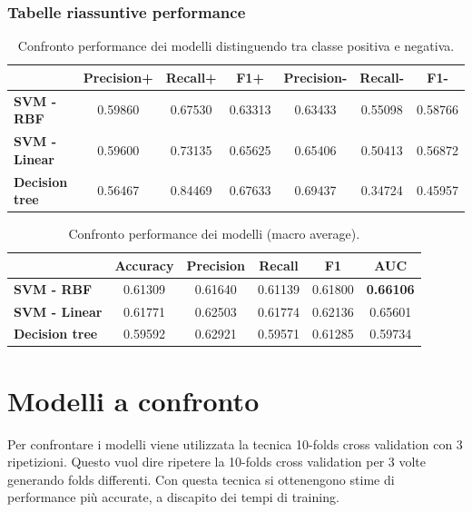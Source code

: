 \subsubsection{Tabelle riassuntive performance}
\begin{table}[H]
	\begin{center}
		\begin{tabular}{ | l | c | c | c | c |  c | c |}
			\hline
			& \textbf{Precision+} & \textbf{Recall+} &\textbf{ F1+ }	& \textbf{Precision-} &\textbf{ Recall-} & \textbf{F1-} \\
			\hline
			\textbf{SVM - RBF} & 0.59860 & 0.67530  & 0.63313 &
												    0.63433 & 0.55098 & 0.58766\\
			\textbf{SVM - Linear} & 0.59600 & 0.73135 & 0.65625&
													0.65406 & 0.50413 & 0.56872\\
			\textbf{Decision tree} & 0.56467&  0.84469 & 0.67633 & 
										0.69437 & 0.34724 & 0.45957 \\
			\hline
		\end{tabular}
	\end{center}
	\caption{Confronto performance dei modelli distinguendo tra classe positiva e negativa.}
\end{table}




\begin{table}[H]
	\begin{center}
		\begin{tabular}{ | l | c | c | c | c |  c |}
			\hline
			& \textbf{Accuracy} & \textbf{Precision} &\textbf{ Recall }	& \textbf{F1} &\textbf{ AUC} \\
			\hline
			\textbf{SVM - RBF} & 0.61309 & 0.61640 & 0.61139  & 0.61800 & \textbf{0.66106} \\
			\textbf{SVM - Linear} & 0.61771 & 0.62503 & 0.61774 & 0.62136 & 0.65601 \\
			\textbf{Decision tree} & 0.59592 & 0.62921 & 0.59571 	& 0.61285 & 0.59734\\
			\hline
		\end{tabular}
	\end{center}
	\caption{Confronto performance dei modelli (macro average).}
\end{table}


\section{Modelli a confronto}
\label{sec:modelli_confronto}
Per confrontare i modelli viene utilizzata la tecnica 10-folds cross
validation con 3 ripetizioni. Questo vuol dire ripetere la 10-folds
cross validation per 3 volte generando folds differenti. Con questa
tecnica si ottenengono stime di performance più accurate, a discapito
dei tempi di training.

